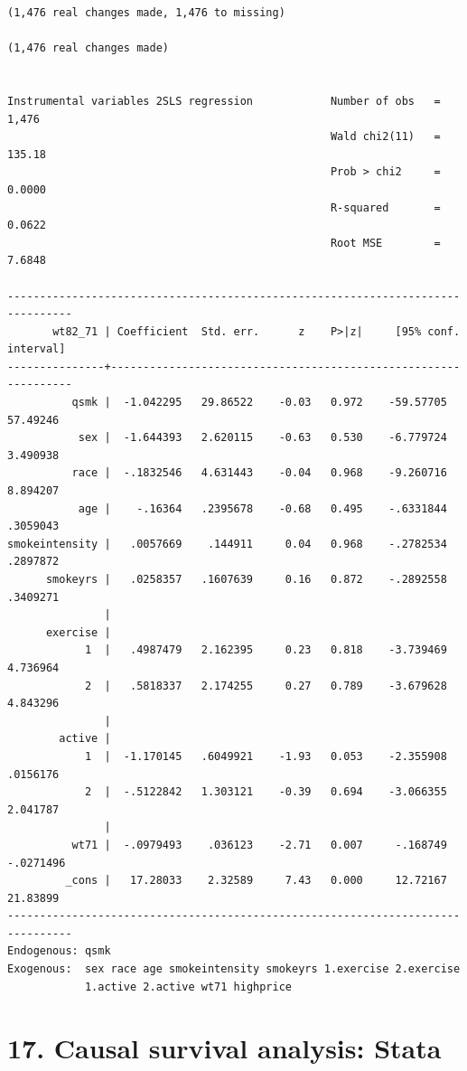 \documentclass[
  10pt,
  a4paper,
]{book}
\begin{document}
\begin{verbatim}
(1,476 real changes made, 1,476 to missing)

(1,476 real changes made)


Instrumental variables 2SLS regression            Number of obs   =      1,476
                                                  Wald chi2(11)   =     135.18
                                                  Prob > chi2     =     0.0000
                                                  R-squared       =     0.0622
                                                  Root MSE        =     7.6848

--------------------------------------------------------------------------------
       wt82_71 | Coefficient  Std. err.      z    P>|z|     [95% conf. interval]
---------------+----------------------------------------------------------------
          qsmk |  -1.042295   29.86522    -0.03   0.972    -59.57705    57.49246
           sex |  -1.644393   2.620115    -0.63   0.530    -6.779724    3.490938
          race |  -.1832546   4.631443    -0.04   0.968    -9.260716    8.894207
           age |    -.16364   .2395678    -0.68   0.495    -.6331844    .3059043
smokeintensity |   .0057669    .144911     0.04   0.968    -.2782534    .2897872
      smokeyrs |   .0258357   .1607639     0.16   0.872    -.2892558    .3409271
               |
      exercise |
            1  |   .4987479   2.162395     0.23   0.818    -3.739469    4.736964
            2  |   .5818337   2.174255     0.27   0.789    -3.679628    4.843296
               |
        active |
            1  |  -1.170145   .6049921    -1.93   0.053    -2.355908    .0156176
            2  |  -.5122842   1.303121    -0.39   0.694    -3.066355    2.041787
               |
          wt71 |  -.0979493    .036123    -2.71   0.007     -.168749   -.0271496
         _cons |   17.28033    2.32589     7.43   0.000     12.72167    21.83899
--------------------------------------------------------------------------------
Endogenous: qsmk
Exogenous:  sex race age smokeintensity smokeyrs 1.exercise 2.exercise
            1.active 2.active wt71 highprice
\end{verbatim}

\chapter*{17. Causal survival analysis: Stata}\label{causal-survival-analysis-stata}
\end{document}
